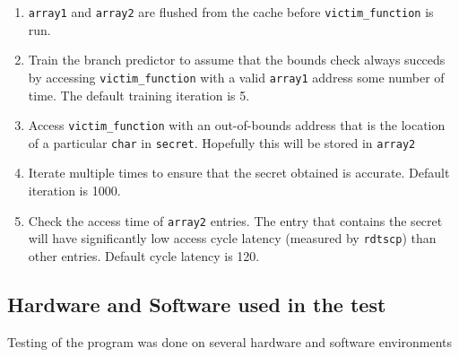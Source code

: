 \documentclass[10pt,twocolumn,letterpaper]{article}
\begin{document}
\begin{enumerate}
	\item \texttt{array1} and \texttt{array2} are flushed from the cache before \lstinline{victim_function} is run.
	\vspace{-2mm}
	\item Train the branch predictor to assume that the bounds check always succeds by accessing \lstinline{victim_function} with a 		valid \texttt{array1} address some number of time. The default training iteration is 5.
	\vspace{-2mm}
	\item Access \lstinline{victim_function} with an out-of-bounds address that is the location of a particular \lstinline{char} in 			\lstinline{secret}. Hopefully this will be stored in \texttt{array2}
	\vspace{-2mm}
	\item Iterate multiple times to ensure that the secret obtained is accurate. Default iteration is 1000.
	\vspace{-2mm}
	\item Check the access time of \texttt{array2} entries. The entry that contains the secret will have significantly low access cycle latency (measured by \texttt{rdtscp}) than other entries. Default cycle latency is 120. 
\end{enumerate}

\subsection{Hardware and Software used in the test}
Testing of the program was done on several hardware and software environments

\begin{table}[htb]
\LARGE
	\begin{center}
		\caption{Hardware and Software under Testing}
		\label{tab:table1}
	\end{center}
\end{table}
	
\end{document}
